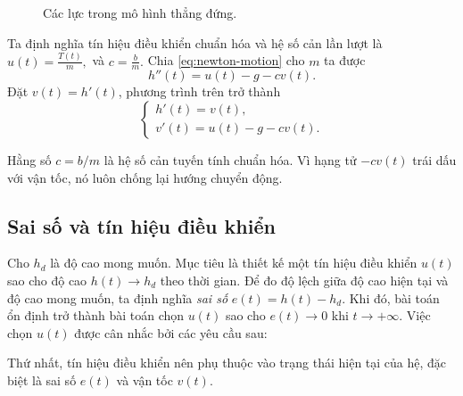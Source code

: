 ﻿\documentclass[12pt]{article}
\begin{document}
\begin{figure}[h]
\centering
{}
\caption{Các lực trong mô hình thẳng đứng.}
\end{figure}
Ta định nghĩa tín hiệu điều khiển chuẩn hóa và hệ số cản lần lượt là
$u(t) = \frac{T(t)}{m},$ và $c = \frac{b}{m}.$
Chia \eqref{eq:newton-motion} cho $m$ ta được
\begin{equation}\label{eq:normalized-motion}
 h''(t) = u(t) - g - cv(t).
\end{equation}
Đặt $v(t) = h'(t)$, phương trình trên trở thành
\begin{equation}\label{eq:motion-system}
\boxed{
\begin{cases}
 h'(t) = v(t),\\
 v'(t) = u(t) - g - cv(t).
\end{cases}
}
\end{equation}

Hằng số $c = b/m$ là hệ số cản tuyến tính chuẩn hóa.
Vì hạng tử $-cv(t)$ trái dấu với vận tốc, nó luôn chống lại hướng chuyển động.

\subsection{Sai số và tín hiệu điều khiển}
Cho $h_d$ là độ cao mong muốn. Mục tiêu là thiết kế một tín hiệu điều khiển  $u(t)$ sao cho độ cao $h(t) \to h_d$ theo thời gian. Để đo độ lệch giữa độ cao hiện tại và độ cao mong muốn, ta định nghĩa \textit{sai số } $e(t) = h(t) - h_d.$ Khi đó, bài toán ổn định trở thành bài toán chọn $u(t)$ sao cho $e(t) \to 0$ khi $t \to + \infty$. Việc chọn $u(t)$ được cân nhắc bởi các yêu cầu sau:

Thứ nhất, tín hiệu điều khiển nên phụ thuộc vào trạng thái hiện tại của hệ, đặc biệt là sai số $e(t)$ và vận tốc $v(t)$.
\end{document}
